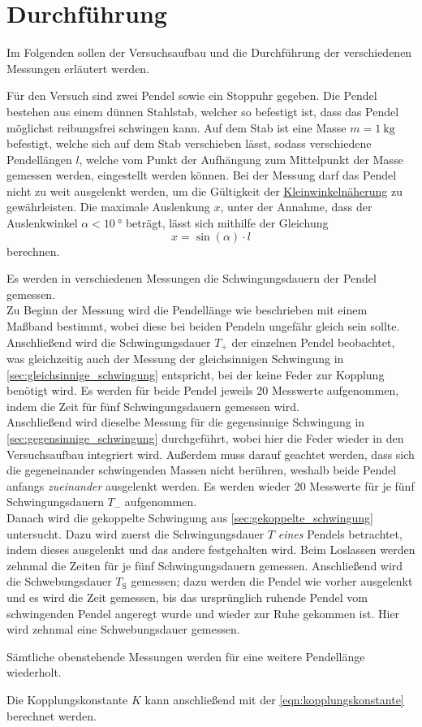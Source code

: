\section{Durchführung}

    Im Folgenden sollen der Versuchsaufbau
    und die Durchführung der verschiedenen Messungen erläutert werden.


    Für den Versuch sind zwei Pendel sowie ein Stoppuhr gegeben.
    Die Pendel bestehen aus einem dünnen Stahlstab,
    welcher so befestigt ist,
    dass das Pendel möglichst reibungsfrei schwingen kann.
    Auf dem Stab ist eine Masse $m = \SI{1}{\kilo\gram}$ befestigt,
    welche sich auf dem Stab verschieben lässt,
    sodass verschiedene Pendellängen $l$,
    welche vom Punkt der Aufhängung zum Mittelpunkt der Masse gemessen werden,
    eingestellt werden können.
    Bei der Messung darf das Pendel nicht zu weit ausgelenkt werden,
    um die Gültigkeit der \hyperref[eqn:kleinwinkelnaeherung]{Kleinwinkelnäherung} zu gewährleisten.
    Die maximale Auslenkung $x$,
    unter der Annahme,
    dass der Auslenkwinkel $\alpha < \SI{10}{\degree}$ beträgt,
    lässt sich mithilfe der Gleichung
    \begin{equation}
        x = \sin{(\alpha)} \cdot l
    \end{equation}
    berechnen.


    Es werden in verschiedenen Messungen die Schwingungsdauern der Pendel gemessen.\\
    Zu Beginn der Messung wird die Pendellänge wie beschrieben mit einem Maßband bestimmt,
    wobei diese bei beiden Pendeln ungefähr gleich sein sollte.
    Anschließend wird die Schwingungsdauer $T_+$ der einzelnen Pendel beobachtet,
    was gleichzeitig auch der Messung der gleichsinnigen Schwingung in \autoref{sec:gleichsinnige_schwingung} entspricht,
    bei der keine Feder zur Kopplung benötigt wird.
    Es werden für beide Pendel jeweils 20 Messwerte aufgenommen,
    indem die Zeit für fünf Schwingungsdauern gemessen wird.\\
    Anschließend wird dieselbe Messung für die gegensinnige Schwingung in \autoref{sec:gegensinnige_schwingung} durchgeführt,
    wobei hier die Feder wieder in den Versuchsaufbau integriert wird.
    Außerdem muss darauf geachtet werden,
    dass sich die gegeneinander schwingenden Massen nicht berühren,
    weshalb beide Pendel anfangs \textit{zueinander} ausgelenkt werden.
    Es werden wieder 20 Messwerte für je fünf Schwingungsdauern $T_-$ aufgenommen.\\
    Danach wird die gekoppelte Schwingung aus \autoref{sec:gekoppelte_schwingung} untersucht.
    Dazu wird zuerst die Schwingungsdauer $T$ \textit{eines} Pendels betrachtet,
    indem dieses ausgelenkt
    und das andere festgehalten wird.
    Beim Loslassen werden zehnmal die Zeiten für je fünf Schwingungsdauern gemessen.
    Anschließend wird die Schwebungsdauer $T_\text{S}$ gemessen;
    dazu werden die Pendel wie vorher ausgelenkt und es wird die Zeit gemessen,
    bis das ursprünglich ruhende Pendel vom schwingenden Pendel angeregt wurde und wieder zur Ruhe gekommen ist.
    Hier wird zehnmal eine Schwebungsdauer gemessen.


    Sämtliche obenstehende Messungen werden für eine weitere Pendellänge wiederholt.


    Die Kopplungskonstante $K$ kann anschließend mit der \autoref{eqn:kopplungskonstante} berechnet werden.
